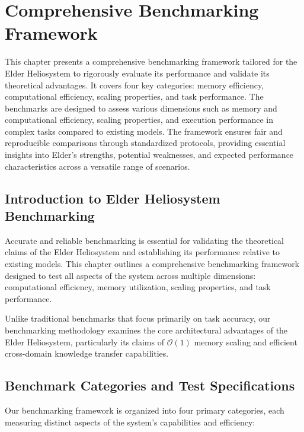 \chapter{Comprehensive Benchmarking Framework}

\begin{tcolorbox}[colback=blue!5!white,colframe=blue!75!black,title=Chapter Summary]
This chapter presents a comprehensive benchmarking framework tailored for the Elder Heliosystem to rigorously evaluate its performance and validate its theoretical advantages. It covers four key categories: memory efficiency, computational efficiency, scaling properties, and task performance. The benchmarks are designed to assess various dimensions such as memory and computational efficiency, scaling properties, and execution performance in complex tasks compared to existing models. The framework ensures fair and reproducible comparisons through standardized protocols, providing essential insights into Elder's strengths, potential weaknesses, and expected performance characteristics across a versatile range of scenarios.
\end{tcolorbox}

\section{Introduction to Elder Heliosystem Benchmarking}

Accurate and reliable benchmarking is essential for validating the theoretical claims of the Elder Heliosystem and establishing its performance relative to existing models. This chapter outlines a comprehensive benchmarking framework designed to test all aspects of the system across multiple dimensions: computational efficiency, memory utilization, scaling properties, and task performance. 

Unlike traditional benchmarks that focus primarily on task accuracy, our benchmarking methodology examines the core architectural advantages of the Elder Heliosystem, particularly its claims of $\mathcal{O}(1)$ memory scaling and efficient cross-domain knowledge transfer capabilities.

\section{Benchmark Categories and Test Specifications}

Our benchmarking framework is organized into four primary categories, each measuring distinct aspects of the system's capabilities and efficiency:

